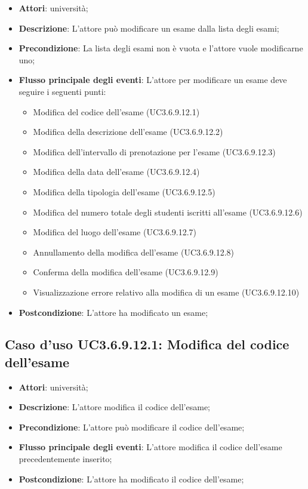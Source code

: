\begin{itemize}
\item \textbf{Attori}: università;
\item \textbf{Descrizione}: L'attore può modificare un esame dalla lista degli esami;

\item \textbf{Precondizione}: La lista degli esami non è vuota e l'attore vuole modificarne uno;

\item \textbf{Flusso principale degli eventi}: L'attore per modificare un esame deve seguire i seguenti punti:

\begin{itemize}
\item Modifica del codice dell’esame (UC3.6.9.12.1)
\item Modifica della descrizione dell’esame (UC3.6.9.12.2)
\item Modifica dell’intervallo di prenotazione per l’esame (UC3.6.9.12.3)
\item Modifica della data dell’esame (UC3.6.9.12.4)
\item Modifica della tipologia dell’esame (UC3.6.9.12.5)
\item Modifica del numero totale degli studenti iscritti all’esame (UC3.6.9.12.6)
\item Modifica del luogo dell’esame (UC3.6.9.12.7)
\item Annullamento della modifica dell’esame (UC3.6.9.12.8)
\item Conferma della modifica dell’esame (UC3.6.9.12.9)
\item Visualizzazione errore relativo alla modifica di un esame (UC3.6.9.12.10)
\end{itemize}
\item \textbf{Postcondizione}: L'attore ha modificato un esame;

\end{itemize}
\subsection{Caso d'uso \texorpdfstring{UC3.6.9.12.1}{UC3.6.9.12.1}: Modifica del codice dell’esame}
\begin{itemize}
\item \textbf{Attori}: università;
\item \textbf{Descrizione}: L'attore modifica il codice dell’esame;

\item \textbf{Precondizione}: L'attore può modificare il codice dell’esame;

\item \textbf{Flusso principale degli eventi}: L'attore modifica il codice dell’esame precedentemente inserito;

\item \textbf{Postcondizione}: L'attore ha modificato il codice dell’esame;

\end{itemize}
